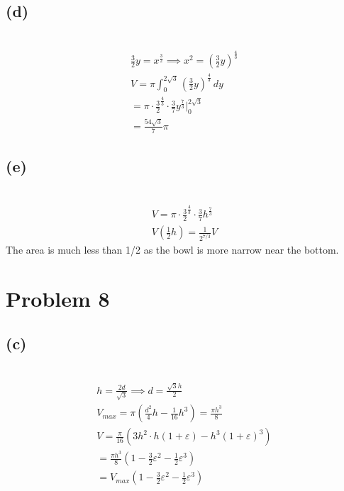 \documentclass[12pt]{article}
\newcommand{\at}{\Big|}
\newcommand{\problem}[1]{\section{Problem #1}}
\newcommand{\subproblem}[1]{\subsection{(#1)} \,}
\begin{document}
\subproblem{d}
\begin{gather*}
    \frac{3}{2}y=x^\frac{3}{2} \implies x^2= (\frac{3}{2}y)^\frac{4}{3}\\
    V=\pi \int_0^{2\sqrt{3}}(\frac{3}{2}y)^\frac{4}{3}\, dy\\
    = \pi \cdot \frac{3}{2}^\frac{4}{3} \cdot \frac{3}{7}y^\frac{7}{3} \at_0^{2\sqrt{3}}\\
    = \boxed{\frac{54\sqrt{3}}{7}\pi }
\end{gather*}

\subproblem{e}
\begin{gather*}
    V=\pi \cdot \frac{3}{2}^\frac{4}{3} \cdot \frac{3}{7}h^\frac{7}{3}\\
    V(\frac{1}{2}h)=\frac{1}{2^{7/3}}V
\end{gather*}
The area is much less than 1/2 as the bowl is more narrow near the bottom.

\problem{8}

\subproblem{c}
\begin{gather*}
    h=\frac{2d}{\sqrt{3}} \implies d = \frac{\sqrt{3}h}{2}\\
    V_{max} = \pi (\frac{d^2}{4}h-\frac{1}{16}h^3)=\frac{\pi h^3}{8}\\
    V=\frac{\pi}{16}(3h^2 \cdot h(1+\varepsilon)- h^3(1+\varepsilon)^3)\\
    = \frac{\pi h^3}{8}(1-\frac{3}{2}\varepsilon^2 -\frac{1}{2}\varepsilon^3)\\
    = \boxed{ V_{max}(1-\frac{3}{2}\varepsilon^2 -\frac{1}{2}\varepsilon^3)}
\end{gather*}
\end{document}
